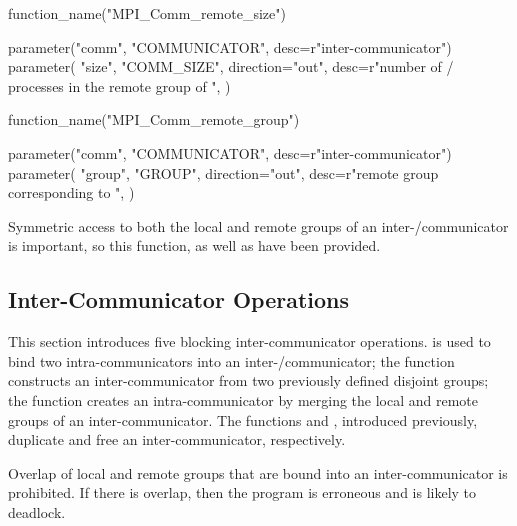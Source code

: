 %
\begin{mpi-binding}
    function_name("MPI_Comm_remote_size")
    
    parameter("comm", "COMMUNICATOR", desc=r"inter-communicator")
    parameter(
        "size",
        "COMM_SIZE",
        direction="out",
        desc=r"number of \MPI/ processes in the remote group of ",
    )
\end{mpi-binding}

%
%
\begin{mpi-binding}
    function_name("MPI_Comm_remote_group")
    
    parameter("comm", "COMMUNICATOR", desc=r"inter-communicator")
    parameter(
        "group",
        "GROUP",
        direction="out",
        desc=r"remote group corresponding to ",
    )
\end{mpi-binding}

\begin{rationale}
Symmetric access to both the local and remote groups of an inter\hyphen/communicator
is important, so this function, as well as  have
been provided.
\end{rationale}



\subsection{Inter-Communicator Operations}
\label{subsec:context-intercomm}

This section introduces five blocking inter-communicator operations.
 is used to bind %
two intra-communicators into an inter\hyphen/communicator; the function
 constructs an inter-communicator
from two previously defined disjoint groups; the function
 creates an intra-communicator by
merging the local and remote groups of an inter-communicator. The
functions \linebreak[3] and
\linebreak[3], introduced previously,
duplicate and free an inter-communicator, respectively.

Overlap of local and remote groups that are bound into an
inter-communicator is prohibited. If there is overlap, then the
program is erroneous and is likely to deadlock.

